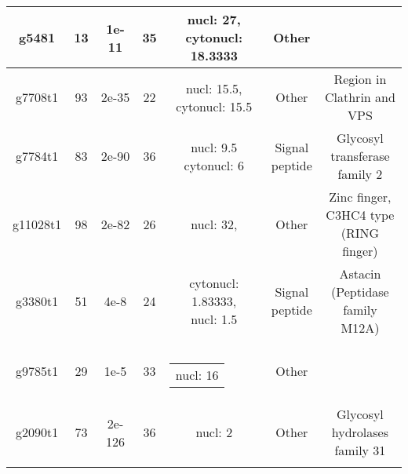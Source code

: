 \documentclass{article}
\makeatletter
\newcommand{\specialcell}[2][c]{%
	\begin{tabular}[#1]{@{}c@{}}#2\end{tabular}}
\makeatother
\begin{document}
\begin{longtable}{|c|c|c|c|c|c|c|}
  
  
  
      		g5481 & 13  &	1e-11 & 35  & \specialcell{  nucl: 27, \\  cytonucl: 18.3333}  & Other & \specialcell{  }  \\ 
  \hline
  
      		g7708t1 & 93  &	2e-35 & 22  & \specialcell{ nucl: 15.5,\\ cytonucl: 15.5  }  & Other & \specialcell{ Region in \\
  	Clathrin and \\
  	VPS}  \\ 
  \hline
  
  
      		g7784t1 & 83  &	2e-90 & 36  & \specialcell{ nucl: 9.5 \\ cytonucl: 6 }  &  \specialcell{Signal \\ peptide}  & \specialcell{ Glycosyl \\
      			transferase \\
      			family 2}  \\ 
  \hline
  
  
      		g11028t1 & 98  &	2e-82 & 26  & \specialcell{ nucl: 32,\\   }  & Other & \specialcell{ Zinc finger,\\
      			C3HC4 type \\
      			(RING finger)}  \\ 
  \hline
  
  
  
      		g3380t1 & 51  &	4e-8 & 24  & \specialcell{
      		
      	cytonucl: 1.83333, \\ nucl: 1.5 
       }  &  \specialcell{Signal \\ peptide}   & \specialcell{ Astacin \\ 
       (Peptidase \\ 
       family M12A)}  \\ 
  \hline
  
  
  
      		g9785t1 & 29  &	1e-5 & 33  & \specialcell{ nucl: 16 }  & Other & \specialcell{ }  \\ 
  \hline
  
  
  
    
  g2090t1 & 73  &	2e-126 & 36  & \specialcell{ nucl: 2\\  }  & Other & \specialcell{ Glycosyl \\
  	hydrolases \\
  	family 31}  \\ 
  \hline
 
 		
 		\hline
 	\caption{   }
 	\label{tab:rarevars}
 \end{longtable}
 
\end{document}
